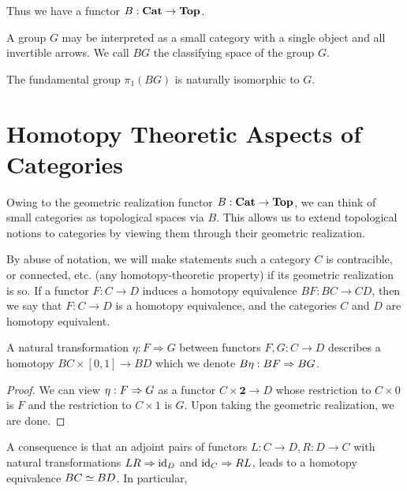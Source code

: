 Thus we have a functor $B : \mathbf{Cat} \to \mathbf{Top}$.

\begin{example}
A group $G$ may be interpreted as a small category with a single object and all invertible arrows.
We call $BG$ the classifying space of the group $G$.
\end{example}

\begin{proposition}
The fundamental group $\pi_1(BG)$ is naturally isomorphic to $G$. 
\end{proposition}

\section{Homotopy Theoretic Aspects of Categories}

Owing to the geometric realization functor $B : \mathbf{Cat} \to \mathbf{Top}$, we can 
think of small categories as topological spaces via $B$.
This allows us to extend topological notions to categories by viewing them through their geometric realization. 

By abuse of notation, we will make statements such a category $C$ is contracible, or connected, etc. (any homotopy-theoretic property)
if its geometric realization is so. 
If a functor $F : C \to D$ induces a homotopy equivalence $BF : BC \to CD$, then we say that $F : C \to D$ is a homotopy equivalence,
and the categories $C$ and $D$ are homotopy equivalent.

\begin{proposition}
A natural transformation $\eta : F \Rightarrow G$ between functors $F, G : C \to D$
describes a homotopy $BC \times [0,1] \to BD$ which we denote $B\eta : BF \Rightarrow BG$.
\end{proposition}
\begin{proof}
We can view $\eta : F \Rightarrow G$ as a functor $C \times \mathbf 2 \to D$ whose restriction
to $C \times {0}$ is $F$ and the restriction to $C \times {1}$ is $G$. 
Upon taking the geometric realization, we are done.
\end{proof}

A consequence is that an adjoint pairs of functors $L : C \to D, R : D \to C$ 
with natural transformations $LR \Rightarrow \operatorname*{id}_D$ and $\operatorname*{id}_C \Rightarrow RL$, leads to a 
homotopy equivalence $BC \simeq BD$. In particular, 

